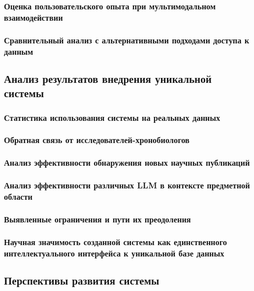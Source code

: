 \documentclass{syksu-coursework}
\begin{document}
\subsubsection{Оценка пользовательского опыта при мультимодальном взаимодействии}

\subsubsection{Сравнительный анализ с альтернативными подходами доступа к данным}

\subsection{Анализ результатов внедрения уникальной системы}

\subsubsection{Статистика использования системы на реальных данных}

\subsubsection{Обратная связь от исследователей-хронобиологов}

\subsubsection{Анализ эффективности обнаружения новых научных публикаций}

\subsubsection{Анализ эффективности различных LLM в контексте предметной области}

\subsubsection{Выявленные ограничения и пути их преодоления}

\subsubsection{Научная значимость созданной системы как единственного интеллектуального интерфейса к уникальной базе данных}

\subsection{Перспективы развития системы}
\end{document}
